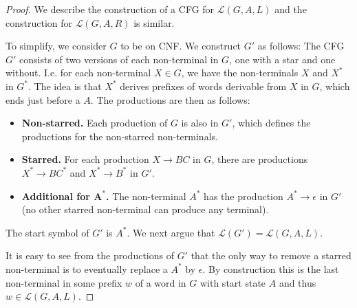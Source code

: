 \documentclass{CSML}
\newcommand{\lang}{\mathcal{L}}
\begin{document}
\begin{proof}
We describe the construction of a CFG for $\lang(G,A,L)$ and the construction for $\lang(G,A,R)$ is similar.

To simplify, we consider $G$ to be on CNF. We construct $G'$ as follows: The CFG $G'$ consists of two versions of each non-terminal in $G$, one with a star and one without. I.e. for each non-terminal $X\in G$, we have the non-terminals $X$ and $X^*$ in $G^*$. The idea is that $X^*$ derives prefixes of words derivable from $X$ in $G$, which ends just before a $A$. 
The productions are then as follows: 
\begin{itemize}
\item {\bf Non-starred.} Each production of $G$ is also in $G'$, which defines the productions for the non-starred non-terminals.
\item {\bf Starred.} For each production $X\rightarrow BC$ in $G$, there are productions $X^*\rightarrow BC^*$ and $X^*\rightarrow B^*$ in $G'$.
\item {\bf Additional for $\mathbold{A^*}$.} The non-terminal $A^*$ has the production $A^*\rightarrow \epsilon$ in $G'$ (no other starred non-terminal can produce any terminal). 
\end{itemize}
The start symbol of $G'$ is $A^*$. 
We next argue that $\lang(G')=\lang(G,A,L)$.

\smallskip\noindent{\bf $\mathbold{\lang(G')\subseteq \lang(G,A,L)}$.}
It is easy to see from the productions of $G'$ that the only way to remove a starred non-terminal is to eventually replace a $A^*$ by $\epsilon$. By construction this is the last non-terminal in some prefix $w$ of a word in $G$ with start state $A$ and thus $w\in \lang(G,A,L)$. 



\end{proof}
\end{document}
